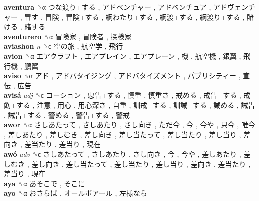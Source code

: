\textbf{aventura} ␝α   つな渡り+する ,  アドベンチャー ,  アドベンチュア ,  アドヴェンチャー ,  冒す ,  冒険 ,  冒険+する ,  綱わたり+する ,  綱渡+する ,  綱渡り+する ,  賭ける ,  賭する   \\
\textbf{aventurero} ␝α   冒険家 ,  冒険者 ,  探検家   \\
\textbf{aviashon} \emph{n}  ␝ϲ   空の旅 ,  航空学 ,  飛行   \\
\textbf{avion} ␝α   エアクラフト ,  エアプレイン ,  エアプレーン ,  機 ,  航空機 ,  銀翼 ,  飛行機 ,  鵬翼   \\
\textbf{aviso} ␝α   アド ,  アドバタイジング ,  アドバタイズメント ,  パブリシティー ,  宣伝 ,  広告   \\
\textbf{avisá} \emph{adj}  ␝ϲ   コーション ,  忠告+する ,  慎重 ,  慎重さ ,  戒める ,  戒告+する ,  戒飭+する ,  注意 ,  用心 ,  用心深さ ,  自重 ,  訓戒+する ,  訓誡+する ,  誡める ,  誡告 ,  誡告+する ,  警める ,  警告+する ,  警戒   \\
\textbf{awor} ␝α   さしあたって ,  さしあたり ,  さし向き ,  ただ今 ,  今 ,  今や ,  只今 ,  唯今 ,  差しあたり ,  差しむき ,  差し向き ,  差し当たって ,  差し当たり ,  差し当り ,  差向き ,  差当たり ,  差当り ,  現在   \\
\textbf{awó} \emph{adv}  ␝ϲ   さしあたって ,  さしあたり ,  さし向き ,  今 ,  今や ,  差しあたり ,  差しむき ,  差し向き ,  差し当たって ,  差し当たり ,  差し当り ,  差向き ,  差当たり ,  差当り ,  現在   \\
\textbf{aya} ␝α   あそこで ,  そこに   \\
\textbf{ayo} ␝α   おさらば ,  オールボアール ,  左様なら   \\
